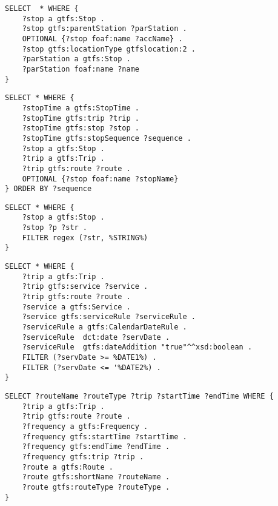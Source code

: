 \begin{lstlisting}[caption=Query 13 - All the accesses of the stations, label=lst:sparql13,basicstyle=\ttfamily,frame=single]
SELECT  * WHERE {     
    ?stop a gtfs:Stop .
    ?stop gtfs:parentStation ?parStation .
    OPTIONAL {?stop foaf:name ?accName} .
    ?stop gtfs:locationType gtfslocation:2 .
    ?parStation a gtfs:Stop .
    ?parStation foaf:name ?name      
}
\end{lstlisting}

\begin{lstlisting}[caption=Query 14 - All stops times and their related routes and stops order by their sequence,label=lst:sparql14,basicstyle=\ttfamily,frame=single]
SELECT * WHERE {
    ?stopTime a gtfs:StopTime .
    ?stopTime gtfs:trip ?trip .
    ?stopTime gtfs:stop ?stop .
    ?stopTime gtfs:stopSequence ?sequence .
    ?stop a gtfs:Stop .
    ?trip a gtfs:Trip .
    ?trip gtfs:route ?route .
    OPTIONAL {?stop foaf:name ?stopName} 
} ORDER BY ?sequence
\end{lstlisting}

\begin{lstlisting}[caption=Query 15 - Everything that contains a specific string in the object placeholder (any property), label=lst:sparql15, basicstyle=\ttfamily,frame=single]
SELECT * WHERE { 
	?stop a gtfs:Stop .
	?stop ?p ?str .
	FILTER regex (?str, %STRING%)
}
\end{lstlisting}

\begin{lstlisting}[caption={Query 16 - For all the routes, all the calendar changes during a specific month}, label=lst:sparql16, basicstyle=\ttfamily,frame=single]
SELECT * WHERE {
	?trip a gtfs:Trip .
	?trip gtfs:service ?service .
	?trip gtfs:route ?route . 
	?service a gtfs:Service .
	?service gtfs:serviceRule ?serviceRule .
	?serviceRule a gtfs:CalendarDateRule .
	?serviceRule  dct:date ?servDate .
	?serviceRule  gtfs:dateAddition "true"^^xsd:boolean .
	FILTER (?servDate >= %DATE1%) .
	FILTER (?servDate <= '%DATE2%) .
}
\end{lstlisting}

\begin{lstlisting}[caption=Query 17 - Trips with their start and end time of the frequencies and associated routes, label=lst:sparql17, basicstyle=\ttfamily,frame=single]
SELECT ?routeName ?routeType ?trip ?startTime ?endTime WHERE {
    ?trip a gtfs:Trip .
    ?trip gtfs:route ?route .
    ?frequency a gtfs:Frequency .
    ?frequency gtfs:startTime ?startTime .
    ?frequency gtfs:endTime ?endTime .
    ?frequency gtfs:trip ?trip .
    ?route a gtfs:Route .
    ?route gtfs:shortName ?routeName .
    ?route gtfs:routeType ?routeType .
}
\end{lstlisting}

